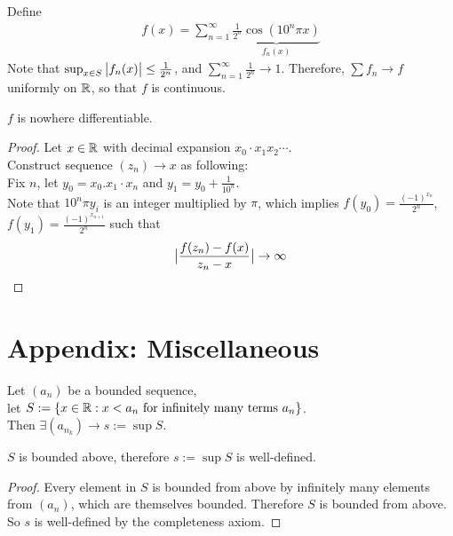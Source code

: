 \documentclass[11pt]{article}
\begin{document}
 	\begin{example}
 		Define
 		\begin{align}
 			f(x) = \sum_{n=1}^\infty \underbrace{\frac{1}{2^n} \cos(10^n \pi x)}_{f_n(x)}
 		\end{align}
 		Note that $\sup_{x \in S} \big \vert {f_n(x)} \big \vert \leq \frac{1}{2^n}$, and $\sum_{n=1}^\infty \frac{1}{2^n} \to 1$. Therefore, $\sum f_n \to f$ uniformly on $\mathbb{R}$, so that $f$ is continuous.
 	\end{example}
 	\begin{proposition}
 		$f$ is nowhere differentiable.
 	\end{proposition}
 	\begin{proof}
 		Let $x \in \mathbb{R}$ with decimal expansion $x_0\cdot x_1 x_2 \cdots$. \\
 		Construct sequence $(z_n) \to x$ as following: \\
		Fix $n$, let $y_0 = x_0.x_1 \cdot x_n$ and $y_1 = y_0 + \frac{1}{10^n}$. \\
		Note that $10^n \pi y_i$ is an integer multiplied by $\pi$, which implies $f(y_0) = \frac{(-1)^{x_n}}{2^n}$, $f(y_1) = \frac{(-1)^{x_{n+1}}}{2^n}$
 		such that
 		\begin{align}
 			\big \vert {\frac{f(z_n) - f(x)}{z_n - x}} \big \vert \to \infty
 		\end{align}
 	\end{proof}
 	
 	\newpage
 	\section{Appendix: Miscellaneous}
 	\begin{proposition}[Midterm 1, Q7]
 		Let $(a_n)$ be a bounded sequence,\\
 		let $S:= \{x \in \mathbb{R}: x < a_n \text{{ for infinitely many terms }}a_n\}$. \\
 		Then $\exists (a_{n_k}) \to s := \sup S$.
 	\end{proposition}
 	
 	\begin{lemma}
 		$S$ is bounded above, therefore $s := \sup S$ is well-defined.
 	\end{lemma}
 	\begin{proof}
 		Every element in $S$ is bounded from above by infinitely many elements from $(a_n)$, which are themselves bounded. Therefore $S$ is bounded from above. \\
 		So $s$ is well-defined by the completeness axiom.
 	\end{proof}
 	
\end{document}
